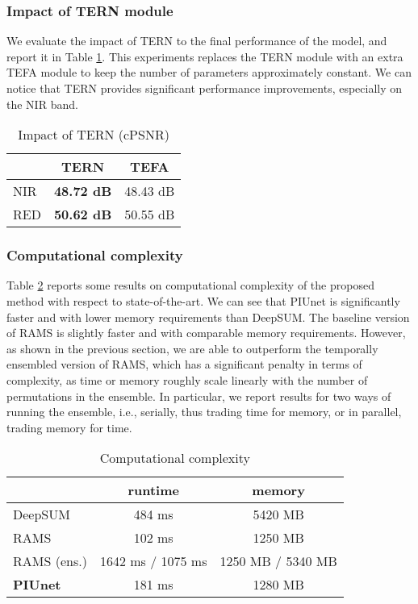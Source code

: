 \documentclass[journal]{IEEEtran}
\begin{document}
\subsubsection{Impact of TERN module}
We evaluate the impact of TERN to the final performance of the model, and report it in Table \ref{table:tern}. This experiments replaces the TERN module with an extra TEFA module to keep the number of parameters approximately constant. We can notice that TERN provides significant performance improvements, especially on the NIR band.

\begin{table}[t]
    \centering
    \caption{Impact of TERN (cPSNR)}
    \label{table:tern}
\begin{tabular}{lcc}
    & TERN & TEFA  \\ \hline \hline
NIR & \textbf{48.72 dB} & 48.43 dB  \\
RED & \textbf{50.62 dB} & 50.55 dB \\
\hline
\end{tabular}
\end{table}



\subsubsection{Computational complexity}
Table \ref{table:complexity} reports some results on computational complexity of the proposed method with respect to state-of-the-art. We can see that PIUnet is significantly faster and with lower memory requirements than DeepSUM. The baseline version of RAMS is slightly faster and with comparable memory requirements. However, as shown in the previous section, we are able to outperform the temporally ensembled version of RAMS, which has a significant penalty in terms of complexity, as time or memory roughly scale linearly with the number of permutations in the ensemble. In particular, we report results for two ways of running the ensemble, i.e., serially, thus trading time for memory, or in parallel, trading memory for time. 
\begin{table}[t]
    \centering
    \caption{Computational complexity}
    \label{table:complexity}
\begin{tabular}{lcc}
                & runtime & memory  \\ \hline \hline
DeepSUM         & 484 ms & 5420 MB \\
RAMS            & 102 ms & 1250 MB \\
RAMS (ens.)     & 1642 ms / 1075 ms & 1250 MB / 5340 MB  \\
\textbf{PIUnet}           & 181 ms & 1280 MB \\
\hline
\end{tabular}
\end{table}
\end{document}
